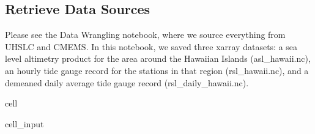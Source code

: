 \documentclass[letterpaper,10pt,english]{jupyterBook}
\begin{document}
\subsection{Retrieve Data Sources}
\label{\detokenize{notebooks/regional_and_local/SL_Trend:retrieve-data-sources}}
\sphinxAtStartPar
Please see the Data Wrangling notebook, where we source everything from UHSLC and CMEMS. In this notebook, we saved three xarray datasets: a sea level altimetry product for the area around the Hawaiian Islands (asl\_hawaii.nc), an hourly tide gauge record for the stations in that region (rsl\_hawaii.nc), and a de\sphinxhyphen{}meaned daily average tide gauge record (rsl\_daily\_hawaii.nc).

\begin{sphinxuseclass}{cell}\begin{sphinxVerbatimInput}

\begin{sphinxuseclass}{cell_input}
\begin{sphinxVerbatim}[commandchars=\\\{\}]
  
  

    
  
  


\end{sphinxVerbatim}
\end{sphinxuseclass}
\end{sphinxVerbatimInput}
\end{sphinxuseclass}
\end{document}
